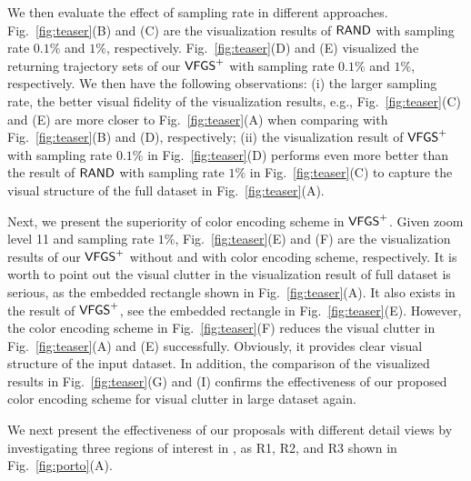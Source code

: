 We then evaluate the effect of sampling rate in different approaches.
Fig.~\ref{fig:teaser}(B) and (C) are the visualization results of $\mathsf{RAND}{}$ with sampling rate $0.1\%$ and $1\%$, respectively.
Fig.~\ref{fig:teaser}(D) and (E) visualized the returning trajectory sets of our $\mathsf{VFGS}^{+}{}$ with sampling rate $0.1\%$ and $1\%$, respectively.
We then have the following observations:
(i) the larger sampling rate, the better visual fidelity of the visualization results, e.g.,
Fig.~\ref{fig:teaser}(C) and (E) are more closer to Fig.~\ref{fig:teaser}(A) when comparing with Fig.~\ref{fig:teaser}(B) and (D), respectively;
(ii) the visualization result of $\mathsf{VFGS}^{+}$ with sampling rate $0.1\%$ in Fig.~\ref{fig:teaser}(D)
performs even more better than the result of $\mathsf{RAND}{}$ with sampling rate $1\%$ in Fig.~\ref{fig:teaser}(C) to capture the visual structure of the full dataset in Fig.~\ref{fig:teaser}(A).


Next, we present the superiority of color encoding scheme in $\mathsf{VFGS}^{+}$.
Given zoom level 11 and sampling rate $1\%$, Fig.~\ref{fig:teaser}(E) and (F) are the visualization results of our $\mathsf{VFGS}^{+}$ without and with color encoding scheme, respectively.
It is worth to point out the visual clutter in the visualization result of full dataset is serious, as the embedded rectangle shown in Fig.~\ref{fig:teaser}(A).
It also exists in the result of $\mathsf{VFGS}^{+}$, see the embedded rectangle in Fig.~\ref{fig:teaser}(E).
However, the color encoding scheme in Fig.~\ref{fig:teaser}(F) reduces the visual clutter in Fig.~\ref{fig:teaser}(A) and (E) successfully.
Obviously, it provides clear visual structure of the input dataset.
In addition, the comparison of the visualized results in Fig.~\ref{fig:teaser}(G) and (I) confirms the effectiveness of our proposed color encoding scheme for visual clutter in large dataset again.

We next present the effectiveness of our proposals with different detail views by investigating three regions of interest in \pt{}, as R1, R2, and R3 shown in Fig.~\ref{fig:porto}(A).


